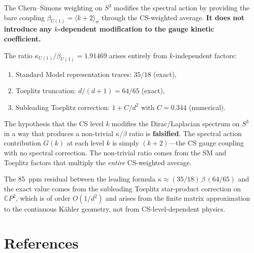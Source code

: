 \documentclass[12pt,a4paper]{article}
\theoremstyle{definition}
\theoremstyle{remark}
\begin{document}
\begin{tcolorbox}[colback=blue!5!white, colframe=blue!50!black,
  title=Principal Finding]
The Chern--Simons weighting on $S^3$ modifies the spectral action by
providing the bare coupling $\beta_{U(1)} = \langle k+2 \rangle_w$
through the CS-weighted average.  \textbf{It does not introduce any
$k$-dependent modification to the gauge kinetic coefficient.}

The ratio $\kappa_{U(1)}/\beta_{U(1)} = 1.91469$ arises entirely from
$k$-independent factors:
\begin{enumerate}
\item Standard Model representation traces: $35/18$ (exact),
\item Toeplitz truncation: $d/(d+1) = 64/65$ (exact),
\item Subleading Toeplitz correction: $1 + C/d^2$ with
  $C = 0.344$ (numerical).
\end{enumerate}
\end{tcolorbox}

\begin{tcolorbox}[colback=yellow!5!white, colframe=orange!60!black,
  title=Regarding the Initial Hypothesis]
The hypothesis that the CS level $k$ modifies the Dirac/Laplacian spectrum
on $S^3$ in a way that produces a non-trivial $\kappa/\beta$ ratio is
\textbf{falsified}.  The spectral action contribution $G(k)$ at each
level $k$ is simply $(k+2)$---the CS gauge coupling with no spectral
correction.  The non-trivial ratio comes from the SM and Toeplitz factors
that multiply the \emph{entire} CS-weighted average.

The 85~ppm residual between the leading formula
$\kappa \approx (35/18)\,\beta\,(64/65)$ and the exact value comes from
the subleading Toeplitz star-product correction on $\mathbb{C}P^2$,
which is of order $O(1/d^2)$ and arises from the finite matrix
approximation to the continuous K\"ahler geometry, not from
CS-level-dependent physics.
\end{tcolorbox}

\section*{References}
\end{document}
